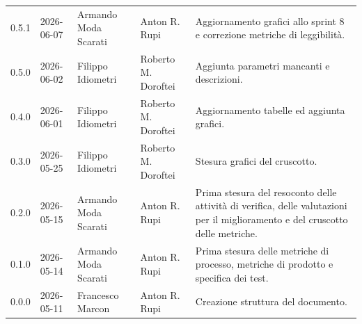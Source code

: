 \begin{longtable}{>{\ttfamily\small}l l l l p{4cm}}
	0.5.1 & 2026-06-07 & {Armando Moda Scarati} & {Anton R. Rupi} & Aggiornamento grafici allo sprint 8 e correzione metriche di leggibilità. \\
	0.5.0 & 2026-06-02 & {Filippo Idiometri} & {Roberto M. Doroftei} & Aggiunta parametri mancanti e descrizioni. \\
	0.4.0 & 2026-06-01 & {Filippo Idiometri} & {Roberto M. Doroftei} & Aggiornamento tabelle ed aggiunta grafici. \\
	0.3.0 & 2026-05-25 & {Filippo Idiometri} & {Roberto M. Doroftei} & Stesura grafici del cruscotto. \\
	0.2.0 & 2026-05-15 & {Armando Moda Scarati} & {Anton R. Rupi} & Prima stesura del resoconto delle attività di verifica, delle valutazioni per il miglioramento e del cruscotto delle metriche. \\
	0.1.0 & 2026-05-14 & {Armando Moda Scarati} & {Anton R. Rupi} & Prima stesura delle metriche di processo, metriche di prodotto e specifica dei test. \\
	0.0.0 & 2026-05-11 & {Francesco Marcon} & {Anton R. Rupi} & Creazione struttura del documento. \\
\end{longtable}